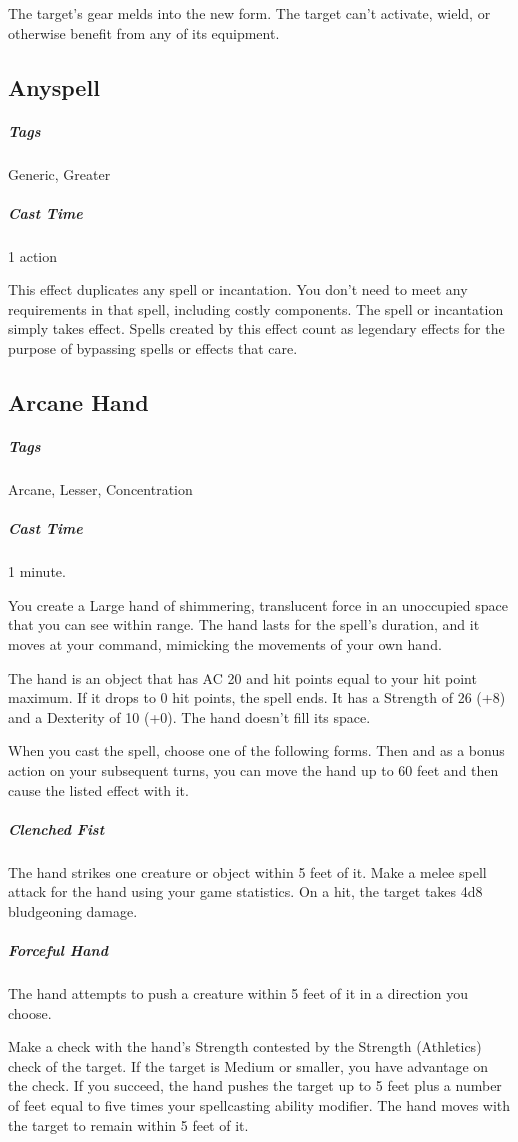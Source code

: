 The target's gear melds into the new form. The target can't activate, wield, or otherwise benefit from any of its equipment.

\subsection{Anyspell}\label{spell:anyspell}
\subparagraph*{Tags} Generic, Greater
\subparagraph*{Cast Time} 1 action

This effect duplicates any spell or incantation. You don't need to meet any requirements in that spell, including costly components. The spell or incantation simply takes effect. Spells created by this effect count as legendary effects for the purpose of bypassing spells or effects that care.

\subsection{Arcane Hand}\label{spell:arcane-hand}
\subparagraph*{Tags} Arcane, Lesser, Concentration
\subparagraph*{Cast Time} 1 minute.

You create a Large hand of shimmering, translucent force in an unoccupied space that you can see within range. The hand lasts for the spell's duration, and it moves at your command, mimicking the movements of your own hand.

The hand is an object that has AC 20 and hit points equal to your hit point maximum. If it drops to 0 hit points, the spell ends. It has a Strength of 26 (+8) and a Dexterity of 10 (+0). The hand doesn't fill its space.

When you cast the spell, choose one of the following forms. Then and as a bonus action on your subsequent turns, you can move the hand up to 60 feet and then cause the listed effect with it.

\subparagraph*{Clenched Fist} The hand strikes one creature or object within 5 feet of it. Make a melee spell attack for the hand using your game statistics. On a hit, the target takes 4d8 bludgeoning damage.

\subparagraph*{Forceful Hand} The hand attempts to push a creature within 5 feet of it in a direction you choose.

Make a check with the hand's Strength contested by the Strength (Athletics) check of the target. If the target is Medium or smaller, you have advantage on the check. If you succeed, the hand pushes the target up to 5 feet plus a number of feet equal to five times your spellcasting ability modifier. The hand moves with the target to remain within 5 feet of it.

